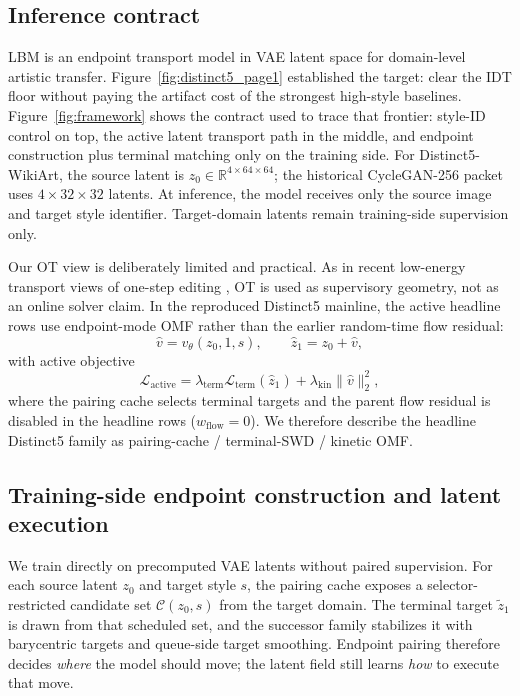 \documentclass[letterpaper]{article}
\begin{document}
\subsection{Inference contract}
LBM is an endpoint transport model in VAE latent space for domain-level artistic transfer. Figure~\ref{fig:distinct5_page1} established the target: clear the IDT floor without paying the artifact cost of the strongest high-style baselines. Figure~\ref{fig:framework} shows the contract used to trace that frontier: style-ID control on top, the active latent transport path in the middle, and endpoint construction plus terminal matching only on the training side. For Distinct5-WikiArt, the source latent is $z_0 \in \mathbb{R}^{4 \times 64 \times 64}$; the historical CycleGAN-256 packet uses $4 \times 32 \times 32$ latents. At inference, the model receives only the source image and target style identifier. Target-domain latents remain training-side supervision only.

Our OT view is deliberately limited and practical. As in recent low-energy transport views of one-step editing \cite{lu2026chordedit}, OT is used as supervisory geometry, not as an online solver claim. In the reproduced Distinct5 mainline, the active headline rows use endpoint-mode OMF rather than the earlier random-time flow residual:
\begin{equation}
    \hat v = v_\theta(z_0,1,s), \qquad \hat z_1 = z_0 + \hat v,
\end{equation}
with active objective
\begin{equation}
    \mathcal{L}_{\mathrm{active}} =
    \lambda_{\mathrm{term}}\mathcal{L}_{\mathrm{term}}(\hat z_1)
    + \lambda_{\mathrm{kin}}\|\hat v\|_2^2,
    \label{eq:active_distinct5_loss}
\end{equation}
where the pairing cache selects terminal targets and the parent flow residual is disabled in the headline rows ($w_{\mathrm{flow}}=0$). We therefore describe the headline Distinct5 family as pairing-cache / terminal-SWD / kinetic OMF.

\subsection{Training-side endpoint construction and latent execution}
We train directly on precomputed VAE latents without paired supervision. For each source latent $z_0$ and target style $s$, the pairing cache exposes a selector-restricted candidate set $\mathcal{C}(z_0,s)$ from the target domain. The terminal target $\tilde z_1$ is drawn from that scheduled set, and the successor family stabilizes it with barycentric targets and queue-side target smoothing. Endpoint pairing therefore decides \emph{where} the model should move; the latent field still learns \emph{how} to execute that move.
\end{document}
